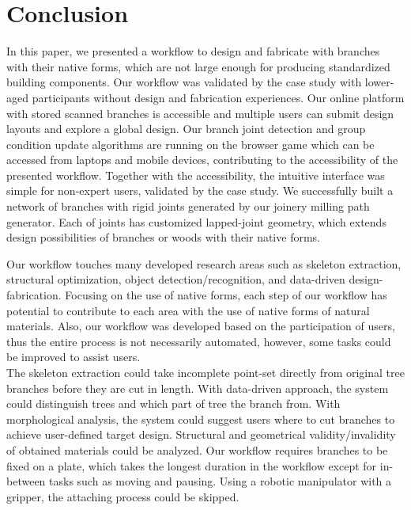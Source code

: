 \section{Conclusion}
In this paper, we presented a workflow to design and fabricate with branches with their native forms, which are not large enough for producing standardized building components.
Our workflow was validated by the case study with lower-aged participants without design and fabrication experiences.
Our online platform with stored scanned branches is accessible and multiple users can submit design layouts and explore a global design. %
Our branch joint detection and group condition update algorithms are running on the browser game which can be accessed from laptops and mobile devices, contributing to the accessibility of the presented workflow.
Together with the accessibility, the intuitive interface was simple for non-expert users, validated by the case study.
We successfully built a network of branches with rigid joints generated by our joinery milling path generator.
Each of joints has customized lapped-joint geometry, which extends design possibilities of branches or woods with their native forms.

Our workflow touches many developed research areas such as skeleton extraction, structural optimization, object detection/recognition, and data-driven design-fabrication.
Focusing on the use of native forms, each step of our workflow has potential to contribute to each area with the use of native forms of natural materials.
Also, our workflow was developed based on the participation of users, thus the entire process is not necessarily automated, however, some tasks could be improved to assist users.\\

The skeleton extraction could take incomplete point-set directly from original tree branches before they are cut in length.
With data-driven approach, the system could distinguish trees and which part of tree the branch from.
With morphological analysis, the system could suggest users where to cut branches to achieve user-defined target design.
Structural and geometrical validity/invalidity of obtained materials could be analyzed.
Our workflow requires branches to be fixed on a plate, which takes the longest duration in the workflow except for in-between tasks such as moving and pausing.
Using a robotic manipulator with a gripper, the attaching process could be skipped.

